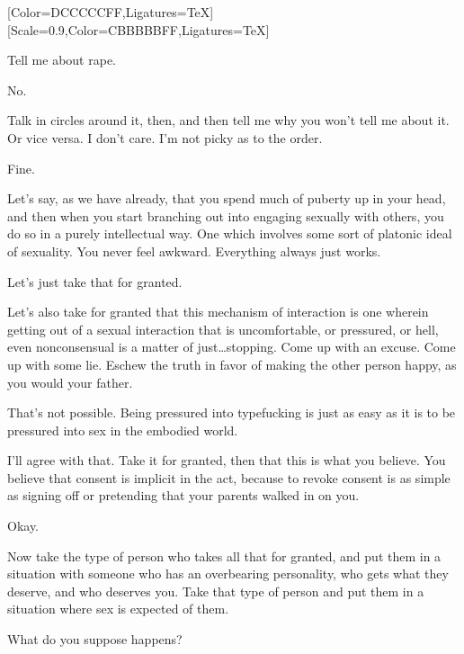 \label{sex:rape}
\renewcommand*{\footnoterule}{%
  \kern-3pt%
  \color[HTML]{dccccc}\hrule width 0.4\columnwidth
  \kern2.6pt}
[Color=DCCCCCFF,Ligatures=TeX]
\renewfontfamily{}[Scale=0.9,Color=CBBBBBFF,Ligatures=TeX]

\begin{ally}
Tell me about rape.
\end{ally}
No.

\begin{ally}
Talk in circles around it, then, and then tell me why you won't tell me about it. Or vice versa. I don't care. I'm not picky as to the order.
\end{ally}
Fine.
\newpage

\noindent Let's say, as we have already, that you spend much of puberty up in your head, and then when you start branching out into engaging sexually with others, you do so in a purely intellectual way. One which involves some sort of platonic ideal of sexuality. You never feel awkward. Everything always just works.

Let's just take that for granted.

Let's also take for granted that this mechanism of interaction is one wherein getting out of a sexual interaction that is uncomfortable, or pressured, or hell, even nonconsensual is a matter of just\ldots{}stopping. Come up with an excuse. Come up with some lie. Eschew the truth in favor of making the other person happy, as you would your father.

\begin{ally}
That's not possible. Being pressured into typefucking is just as easy as it is to be pressured into sex in the embodied world.
\end{ally}
I'll agree with that. Take it for granted, then that this is what you believe. You believe that consent is implicit in the act, because to revoke consent is as simple as signing off or pretending that your parents walked in on you.

\begin{ally}
Okay.
\end{ally}
Now take the type of person who takes all that for granted, and put them in a situation with someone who has an overbearing personality, who gets what they deserve, and who deserves you. Take that type of person and put them in a situation where sex is expected of them.

What do you suppose happens?

